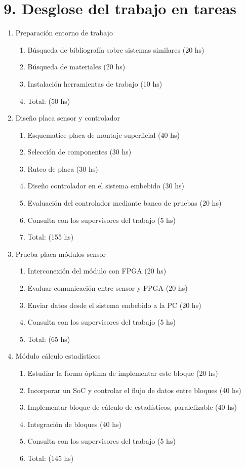 \documentclass[
11pt, %
codirector, %
]{charter}
\begin{document}
\section{9. Desglose del trabajo en tareas}
\label{sec:wbs}


\begin{enumerate}
\item Preparación entorno de trabajo
	\begin{enumerate}
	\item Búsqueda de bibliografía sobre sistemas similares (20 hs)
	\item Búsqueda de materiales (20 hs)
	\item Instalación herramientas de trabajo (10 hs)
	\item Total: (50 hs)
	\end{enumerate}

\item Diseño placa sensor y controlador
	\begin{enumerate}
	\item Esquematice placa de montaje superficial (40 hs)
	\item Selección de componentes (30 hs)
	\item Ruteo de placa (30 hs)
	\item Diseño controlador en el sistema embebido (30 hs)
	\item Evaluación del controlador mediante banco de pruebas (20 hs)
	\item Consulta con los supervisores del trabajo (5 hs)
	\item Total: (155 hs)
	\end{enumerate}

\item Prueba placa módulos sensor
	\begin{enumerate}
	\item Interconexión del módulo con FPGA (20 hs)
	\item Evaluar comunicación entre sensor y FPGA (20 hs)
	\item Enviar datos desde el sistema embebido a la PC (20 hs)
	\item Consulta con los supervisores del trabajo (5 hs)
	\item Total: (65 hs)
	\end{enumerate}

\item Módulo cálculo estadísticos
	\begin{enumerate}
	\item Estudiar la forma óptima de implementar este bloque (20 hs)
	\item Incorporar un SoC y controlar el flujo de datos entre bloques (40 hs)
	\item Implementar bloque de cálculo de estadísticos, paralelizable (40 hs)
	\item Integración de bloques (40 hs)
	\item Consulta con los supervisores del trabajo (5 hs)	
	\item Total: (145 hs)	
	\end{enumerate}	


\end{enumerate}
\end{document}

